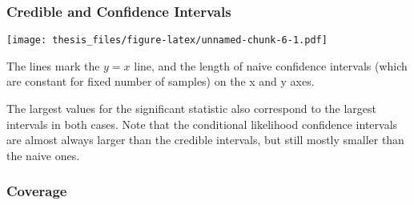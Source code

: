\documentclass[12pt,twoside]{dukestatscithesis}
\theoremstyle{definition}
\theoremstyle{definition}
\theoremstyle{definition}
\theoremstyle{remark}
\begin{document}
\subsubsection{Credible and Confidence
Intervals}\label{credible-and-confidence-intervals}
\begin{Shaded}
\begin{Highlighting}[]
\NormalTok{(}\OperatorTok{+}\StringTok{ }\NormalTok{(}\NormalTok{(}\OperatorTok{-}\OperatorTok{-} \OperatorTok{+}\NormalTok{(} \NormalTok{, } \NormalTok{)}\OperatorTok{+}\NormalTok{(}\OperatorTok{*}\OperatorTok{*}\NormalTok{(}\OperatorTok{/}\NormalTok{))}\OperatorTok{+}\NormalTok{(}\OperatorTok{*}\OperatorTok{*}\NormalTok{(}\OperatorTok{/}\NormalTok{))}\OperatorTok{+}\NormalTok{(}\NormalTok{,}\NormalTok{, }\NormalTok{,}\NormalTok{)}
\end{Highlighting}
\end{Shaded}
\texttt{[image: thesis\_files/figure-latex/unnamed-chunk-6-1.pdf]}

The lines mark the \(y = x\) line, and the length of naive confidence
intervals (which are constant for fixed number of samples) on the x and
y axes.

The largest values for the significant statistic also correspond to the
largest intervals in both cases. Note that the conditional likelihood
confidence intervals are almost always larger than the credible
intervals, but still mostly smaller than the naive ones.

\subsubsection{Coverage}\label{coverage}
\end{document}
